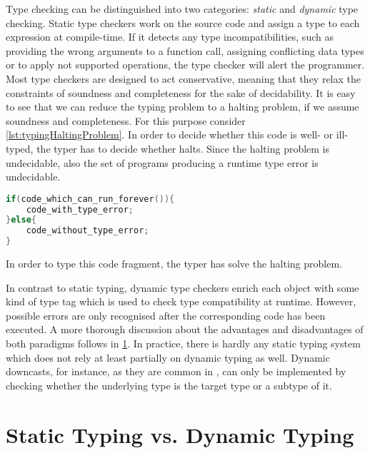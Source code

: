 Type checking can be distinguished into two categories: \emph{static} and \emph{dynamic} type checking.
Static type checkers work on the source code and assign a type to each expression at compile-time.
If it detects any type incompatibilities, such as providing the wrong arguments to a function call, assigning conflicting data types or to apply not supported operations, the type checker will alert the programmer.
Most type checkers are designed to act conservative, meaning that they relax the constraints of soundness and completeness for the sake of decidability.
It is easy to see that we can reduce the typing problem to a halting problem, if we assume soundness and completeness.
For this purpose consider \cref{lst:typingHaltingProblem}.
In order to decide whether this code is well- or ill-typed, the typer has to decide whether  halts.
Since the halting problem is undecidable, also the set of programs producing a runtime type error is undecidable.
\begin{listing}[!h]
	\begin{CenteredBox}
		\begin{lstlisting}[language=C++]
if(code_which_can_run_forever()){
	code_with_type_error;
}else{
	code_without_type_error;
}
		\end{lstlisting}
	\end{CenteredBox}
	\caption{In order to type this code fragment, the typer has solve the halting problem.}
	\label{lst:typingHaltingProblem}
\end{listing}

In contrast to static typing, dynamic type checkers enrich each object with some kind of type tag which is used to check type compatibility at runtime.
However, possible errors are only recognised after the corresponding code has been executed.
A more thorough discussion about the advantages and disadvantages of both paradigms follows in \cref{sec:staticVSDynamic}.
In practice, there is hardly any static typing system which does not rely at least partially on dynamic typing as well.
Dynamic downcasts, for instance, as they are common in , can only be implemented by checking whether the underlying type is the target type or a subtype of it.

\section{Static Typing vs. Dynamic Typing}
\label{sec:staticVSDynamic}

